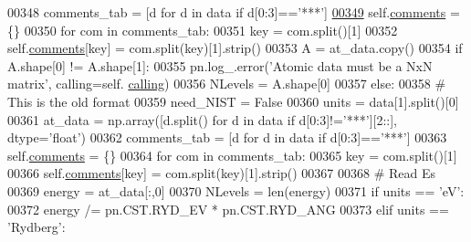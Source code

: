 \begin{DoxyCode}
00348             comments\_tab = [d \textcolor{keywordflow}{for} d \textcolor{keywordflow}{in} data \textcolor{keywordflow}{if} d[0:3]==\textcolor{stringliteral}{'***'}]
\hypertarget{classpyneb_1_1core_1_1pynebcore_1_1___atom_data_ascii_l00349}{}\hyperlink{classpyneb_1_1core_1_1pynebcore_1_1___atom_data_ascii_a935b1baf76c6450653d1ebb673bc8f08}{00349}             self.\hyperlink{classpyneb_1_1core_1_1pynebcore_1_1___atom_data_ascii_a935b1baf76c6450653d1ebb673bc8f08}{comments} = \{\}
00350             \textcolor{keywordflow}{for} com \textcolor{keywordflow}{in} comments\_tab:
00351                 key = com.split()[1]
00352                 self.\hyperlink{classpyneb_1_1core_1_1pynebcore_1_1___atom_data_ascii_a935b1baf76c6450653d1ebb673bc8f08}{comments}[key] = com.split(key)[1].strip()
00353             A = at\_data.copy()
00354             \textcolor{keywordflow}{if} A.shape[0] != A.shape[1]:
00355                 pn.log\_.error(\textcolor{stringliteral}{'Atomic data must be a NxN matrix'}, calling=self.
      \hyperlink{classpyneb_1_1core_1_1pynebcore_1_1___atom_data_ascii_af5c364ae799620ff1af6870cf78ae19b}{calling}) 
00356             NLevels = A.shape[0]
00357         \textcolor{keywordflow}{else}:
00358             \textcolor{comment}{# This is the old format}
00359             need\_NIST = \textcolor{keyword}{False}
00360             units = data[1].split()[0]
00361             at\_data = np.array([d.split() \textcolor{keywordflow}{for} d \textcolor{keywordflow}{in} data \textcolor{keywordflow}{if} d[0:3]!=\textcolor{stringliteral}{'***'}][2::], dtype=\textcolor{stringliteral}{'float'})
00362             comments\_tab = [d \textcolor{keywordflow}{for} d \textcolor{keywordflow}{in} data \textcolor{keywordflow}{if} d[0:3]==\textcolor{stringliteral}{'***'}]
00363             self.\hyperlink{classpyneb_1_1core_1_1pynebcore_1_1___atom_data_ascii_a935b1baf76c6450653d1ebb673bc8f08}{comments} = \{\}
00364             \textcolor{keywordflow}{for} com \textcolor{keywordflow}{in} comments\_tab:
00365                 key = com.split()[1]
00366                 self.\hyperlink{classpyneb_1_1core_1_1pynebcore_1_1___atom_data_ascii_a935b1baf76c6450653d1ebb673bc8f08}{comments}[key] = com.split(key)[1].strip()
00367             
00368             \textcolor{comment}{# Read Es}
00369             energy = at\_data[:,0]
00370             NLevels = len(energy)
00371             \textcolor{keywordflow}{if} units == \textcolor{stringliteral}{'eV'}: 
00372                 energy /= pn.CST.RYD\_EV * pn.CST.RYD\_ANG
00373             \textcolor{keywordflow}{elif} units == \textcolor{stringliteral}{'Rydberg'}:

\end{DoxyCode}
